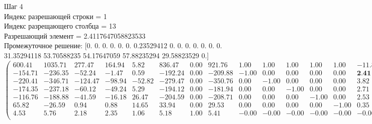 \documentclass[draft]{article}
\begin{document}
\begin{flushleft}
    Шаг 4 \\
    Индекс разрешающей строки = 1\\
    Индекс разрещающего столбца = 13\\
    Разрешающий элемент = 2.4117647058823533\\
    Промежуточное решение:
    [0.  0.  0.  0.  0.  0.  0.23529412  0.  0.  0.  0.  0.  0.  0.  31.35294118  53.70588235  54.17647059  57.88235294  29.58823529  0.]
\begin{equation*}
\begin{pmatrix}
    600.41 & 1035.71 &  277.47 & 164.94 &   5.82 &  836.47 & 0.00 &  921.76 &  1.00 &  1.00 &  1.00 &  1.00 &  1.00 & -11.82 & 0.00 & 0.00 & 0.00 & 0.00 & 0.00 & 12.82 & -226.71 \\
    -154.71 & -236.35 &  -52.24 &  -1.47 &   0.59 & -192.24 & 0.00 & -209.88 & -1.00 &  0.00 &  0.00 &  0.00 &  0.00 &   \textbf{2.41} & 1.00 & 0.00 & 0.00 & 0.00 & 0.00 & -2.41 &   31.35 \\
    -220.41 & -346.71 & -124.47 & -98.94 & -52.82 & -279.47 & 0.00 & -350.76 &  0.00 & -1.00 &  0.00 &  0.00 &  0.00 &   3.82 & 0.00 & 1.00 & 0.00 & 0.00 & 0.00 & -3.82 &   53.71 \\
    -174.35 & -237.18 &  -60.12 & -49.24 &   5.29 & -194.12 & 0.00 & -181.94 &  0.00 &  0.00 & -1.00 &  0.00 &  0.00 &   2.71 & 0.00 & 0.00 & 1.00 & 0.00 & 0.00 & -2.71 &   54.18 \\
    -116.76 & -188.88 &  -41.59 & -16.18 &  26.47 & -204.59 & 0.00 & -208.71 &  0.00 &  0.00 &  0.00 & -1.00 &  0.00 &   2.53 & 0.00 & 0.00 & 0.00 & 1.00 & 0.00 & -2.53 &   57.88 \\
    65.82 &  -26.59 &    0.94 &   0.88 &  14.65 &   33.94 & 0.00 &   29.53 &  0.00 &  0.00 &  0.00 &  0.00 & -1.00 &   0.35 & 0.00 & 0.00 & 0.00 & 0.00 & 1.00 & -0.35 &   29.59 \\
    4.53 &    5.76 &    2.18 &   2.35 &   1.06 &    5.18 & 1.00 &    5.41 & -0.00 & -0.00 & -0.00 & -0.00 & -0.00 &  -0.06 & 0.00 & 0.00 & 0.00 & 0.00 & 0.00 &  0.06 &    0.24 \\
\end{pmatrix}
\end{equation*}
\end{flushleft}
\end{document}
